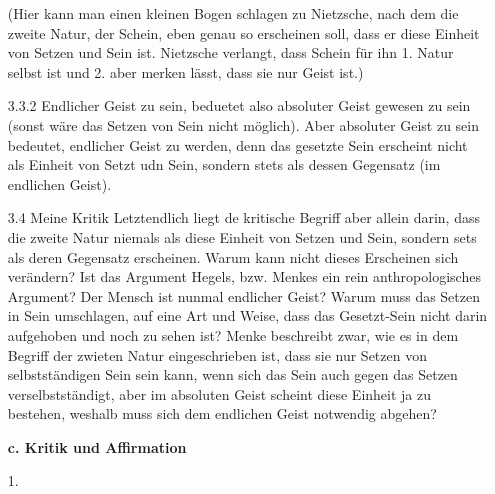 \documentclass[12pt, a4paper, openany]{report}
\begin{document}
\begin{itemize}
    (Hier kann man einen kleinen Bogen schlagen zu Nietzsche, nach dem die zweite Natur, der Schein, eben genau so erscheinen soll, dass er diese Einheit von Setzen und Sein ist.
    Nietzsche verlangt, dass Schein für ihn 1. Natur selbst ist und 2. aber merken lässt, dass sie nur Geist ist.)
    \item[3.3.2] Endlicher Geist zu sein, beduetet also absoluter Geist gewesen zu sein (sonst wäre das Setzen von Sein nicht möglich). 
    Aber absoluter Geist zu sein bedeutet, endlicher Geist zu werden, denn das gesetzte Sein erscheint nicht als Einheit von Setzt udn Sein, sondern stets als dessen Gegensatz (im endlichen Geist).
    \item[3.4 Meine Kritik] Letztendlich liegt de kritische Begriff aber allein darin, dass die zweite Natur niemals als diese Einheit von Setzen und Sein, sondern sets als deren Gegensatz erscheinen. 
    Warum kann nicht dieses Erscheinen sich verändern?
    Ist das Argument Hegels, bzw. Menkes ein rein anthropologisches Argument?
    Der Mensch ist nunmal endlicher Geist? 
    Warum muss das Setzen in Sein umschlagen, auf eine Art und Weise, dass das Gesetzt-Sein nicht darin aufgehoben und noch zu sehen ist?
    Menke beschreibt zwar, wie es in dem Begriff der zwieten Natur eingeschrieben ist, dass sie nur Setzen von selbstständigen Sein sein kann, wenn sich das Sein auch gegen das Setzen verselbstständigt, aber im absoluten Geist scheint diese Einheit ja zu bestehen, weshalb muss sich dem endlichen Geist notwendig abgehen?
    \item[] \textbf{c. Kritik und Affirmation}
    \item [1.] 
\end{itemize}
\end{document}
